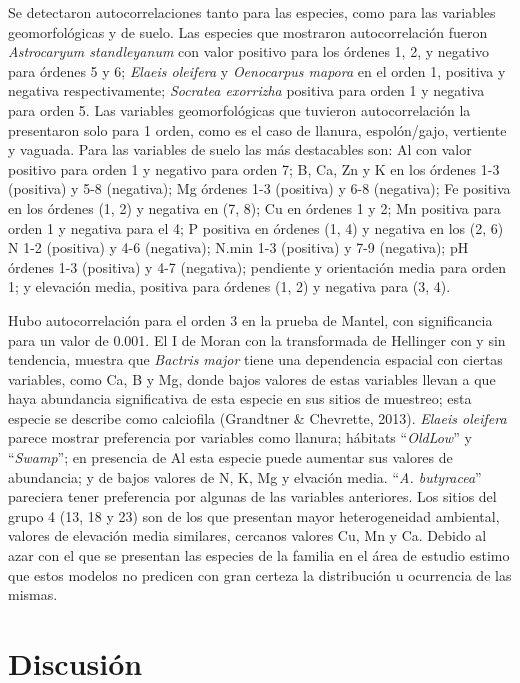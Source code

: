 \documentclass[11pt,]{article}
\begin{document}
Se detectaron autocorrelaciones tanto para las especies, como para las
variables geomorfológicas y de suelo. Las especies que mostraron
autocorrelación fueron \emph{Astrocaryum standleyanum} con valor
positivo para los órdenes 1, 2, y negativo para órdenes 5 y 6;
\emph{Elaeis oleifera} y \emph{Oenocarpus mapora} en el orden 1,
positiva y negativa respectivamente; \emph{Socratea exorrizha} positiva
para orden 1 y negativa para orden 5. Las variables geomorfológicas que
tuvieron autocorrelación la presentaron solo para 1 orden, como es el
caso de llanura, espolón/gajo, vertiente y vaguada. Para las variables
de suelo las más destacables son: Al con valor positivo para orden 1 y
negativo para orden 7; B, Ca, Zn y K en los órdenes 1-3 (positiva) y 5-8
(negativa); Mg órdenes 1-3 (positiva) y 6-8 (negativa); Fe positiva en
los órdenes (1, 2) y negativa en (7, 8); Cu en órdenes 1 y 2; Mn
positiva para orden 1 y negativa para el 4; P positiva en órdenes (1, 4)
y negativa en los (2, 6) N 1-2 (positiva) y 4-6 (negativa); N.min 1-3
(positiva) y 7-9 (negativa); pH órdenes 1-3 (positiva) y 4-7 (negativa);
pendiente y orientación media para orden 1; y elevación media, positiva
para órdenes (1, 2) y negativa para (3, 4).

Hubo autocorrelación para el orden 3 en la prueba de Mantel, con
significancia para un valor de 0.001. El I de Moran con la transformada
de Hellinger con y sin tendencia, muestra que \emph{Bactris major} tiene
una dependencia espacial con ciertas variables, como Ca, B y Mg, donde
bajos valores de estas variables llevan a que haya abundancia
significativa de esta especie en sus sitios de muestreo; esta especie se
describe como calciofila (Grandtner \& Chevrette, 2013). \emph{Elaeis
oleifera} parece mostrar preferencia por variables como llanura;
hábitats ``\emph{OldLow}'' y ``\emph{Swamp}''; en presencia de Al esta
especie puede aumentar sus valores de abundancia; y de bajos valores de
N, K, Mg y elvación media. ``\emph{A. butyracea}'' pareciera tener
preferencia por algunas de las variables anteriores. Los sitios del
grupo 4 (13, 18 y 23) son de los que presentan mayor heterogeneidad
ambiental, valores de elevación media similares, cercanos valores Cu, Mn
y Ca. Debido al azar con el que se presentan las especies de la familia
en el área de estudio estimo que estos modelos no predicen con gran
certeza la distribución u ocurrencia de las mismas.

\section{Discusión}\label{discusiuxf3n}
\end{document}
